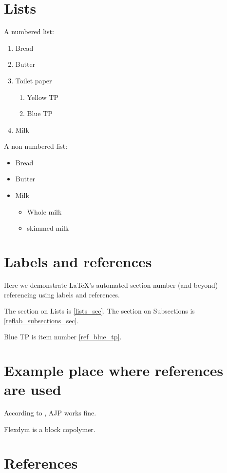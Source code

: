 \documentclass{article}
\begin{document}
  \section{Lists \label{lists_sec}}

    A numbered list:
    \begin{enumerate}
      \item Bread
      \item Butter
      \item Toilet paper
        \begin{enumerate}
          \item Yellow TP
          \item Blue TP \label{ref_blue_tp}
        \end{enumerate}
      \item Milk
    \end{enumerate}

    A non-numbered list:
    \begin{itemize}
      \item Bread
      \item Butter
      \item Milk
        \begin{itemize}
          \item Whole milk 
          \item skimmed milk
        \end{itemize}
    \end{itemize}
  

  \section{Labels and references}

    Here we demonstrate LaTeX's automated section number (and beyond) referencing using labels and references.

    The section on Lists is \ref{lists_sec}. The section on Subsections is \ref{reflab_subsections_sec}.

    Blue TP is item number \ref{ref_blue_tp}. 

  
  \section{Example place where references are used}

  According to \textcite{catic_aerosol-jet_2020}, AJP works fine. 

  Flexdym is a block copolymer. \parencite{lachaux_thermoplastic_2017}

  \section{References}

    \printbibliography
    
\end{document}
